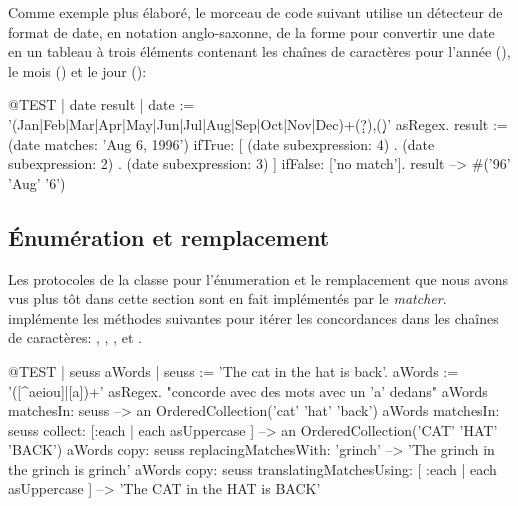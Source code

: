 \documentclass[a4paper,10pt,twoside]{book}
\begin{document}
{Comme exemple plus élaboré, le morceau de code suivant utilise un
détecteur de format de date,
en notation anglo-saxonne,
de la forme  pour convertir une date en un tableau à
trois éléments contenant les chaînes de caractères pour l'année
(), le mois () et le jour ():

\begin{code}{@TEST | date result |}
date := '(Jan|Feb|Mar|Apr|May|Jun|Jul|Aug|Sep|Oct|Nov|Dec)\s+(\d\d?)\s*,(\d\d)' asRegex.
result := (date matches: 'Aug 6, 1996')
       ifTrue: [{ (date subexpression: 4) .
				(date subexpression: 2) .
				(date subexpression: 3) } ]
        ifFalse: ['no match'].
result --> #('96' 'Aug' '6')
\end{code}

\subsection{Énumération et remplacement}

Les protocoles de la classe  pour l'énumeration
 et le remplacement que nous avons vus plus tôt
dans cette section sont en fait implémentés par le \emph{matcher}. 
 implémente les méthodes suivantes pour itérer les
concordances dans les chaînes de caractères:
,
,
,
 et
.

\begin{code}{@TEST | seuss aWords |}
seuss := 'The cat in the hat is back'.
aWords := '\<([^aeiou]|[a])+\>' asRegex.    "concorde avec des mots avec un 'a' dedans"
aWords matchesIn: seuss
    --> an OrderedCollection('cat' 'hat' 'back')
aWords matchesIn: seuss collect: [:each | each asUppercase ]
    --> an OrderedCollection('CAT' 'HAT' 'BACK')
aWords copy: seuss replacingMatchesWith: 'grinch'
    --> 'The grinch in the grinch is grinch'
aWords copy: seuss translatingMatchesUsing: [ :each | each asUppercase ]
    --> 'The CAT in the HAT is BACK'
\end{code} %

}
\end{document}
